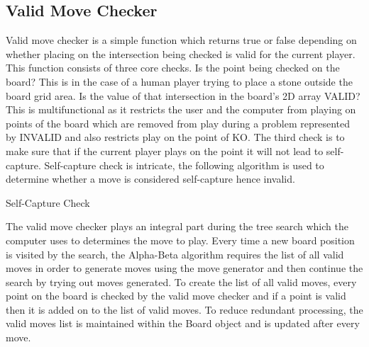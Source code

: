 \documentclass{l4proj}
\begin{document}
\subsection{Valid Move Checker}
Valid move checker is a simple function which returns true or false depending on whether placing on the intersection being checked is valid for the current player. This function consists of three core checks. Is the point being checked on the board? This is in the case of a human player trying to place a stone outside the board grid area. Is the value of that intersection in the board’s 2D array VALID? This is multifunctional as it restricts the user and the computer from playing on points of the board which are removed from play during a problem represented by INVALID and also restricts play on the point of KO. The third check is to make sure that if the current player plays on the point it will not lead to self-capture. Self-capture check is intricate, the following algorithm is used to determine whether a move is considered self-capture hence invalid.

\begin{algorithm}[H]
\caption{Self-Capture Check}\label{Self-Capture Check}
    \DontPrintSemicolon
\end{algorithm}

The valid move checker plays an integral part during the tree search which the computer uses to determines the move to play. Every time a new board position is visited by the search, the Alpha-Beta algorithm requires the list of all valid moves in order to generate moves using the move generator and then continue the search by trying out moves generated. To create the list of all valid moves, every point on the board is checked by the valid move checker and if a point is valid then it is added on to the list of valid moves. To reduce redundant processing, the valid moves list is maintained within the Board object and is updated after every move.
\end{document}
